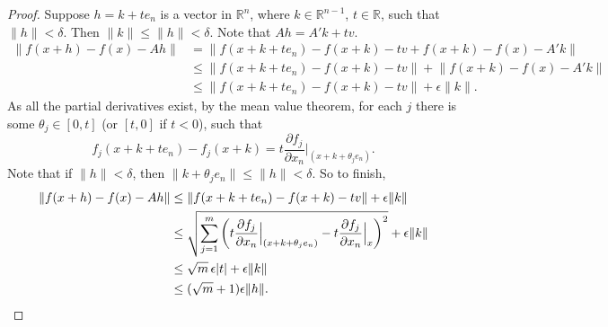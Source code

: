 \documentclass[12pt,openany]{book}
\newcommand{\sabs}[1]{\lvert {#1} \rvert}
\newcommand{\snorm}[1]{\lVert {#1} \rVert}
\newcommand{\R}{{\mathbb{R}}}
\theoremstyle{plain}
\theoremstyle{remark}
\theoremstyle{definition}
\theoremstyle{exercise}
\theoremstyle{example}
\begin{document}
\begin{proof}
Suppose $h = k + t e_n$ is a vector in $\R^n$, where $k \in \R^{n-1}$, $t
\in \R$, such that
$\snorm{h} < \delta$.  Then $\snorm{k} \leq \snorm{h} < \delta$.
Note that $Ah = A' k + tv$.
\begin{equation*}
\begin{split}
\snorm{f(x+h) - f(x) - Ah}
& = \snorm{f(x+k + t e_n) - f(x+k) - tv + f(x+k) - f(x) - A' k}
\\
& \leq \snorm{f(x+k + t e_n) - f(x+k) -tv} + \snorm{f(x+k) - f(x) -
A' k}
\\
& \leq \snorm{f(x+k + t e_n) - f(x+k) -tv} + \epsilon \snorm{k} .
\end{split}
\end{equation*}
As all the partial derivatives exist, by the mean value theorem,
for each $j$ there is some $\theta_j \in [0,t]$ (or $[t,0]$ if $t < 0$), such that
\begin{equation*}
f_j(x+k + t e_n) - f_j(x+k) =
t \frac{\partial f_j}{\partial x_n}\Big|_{(x+k+\theta_j e_n)}.
\end{equation*}
Note that if $\snorm{h} < \delta$, then $\snorm{k+\theta_j e_n} \leq \snorm{h}
< \delta$.
So to finish,
\begin{equation*}
\begin{split}
\snorm{f(x+h) - f(x) - Ah}
& \leq \snorm{f(x+k + t e_n) - f(x+k) -tv} + \epsilon \snorm{k}
\\
& \leq \sqrt{\sum_{j=1}^m
{\left(t\frac{\partial f_j}{\partial x_n}\Big|_{(x+k+\theta_j e_n)} -
t \frac{\partial f_j}{\partial x_n}\Big|_{x}\right)}^2} + \epsilon \snorm{k}
\\
& \leq \sqrt{m}\, \epsilon \sabs{t} + \epsilon \snorm{k}
\\
& \leq (\sqrt{m}+1)\epsilon \snorm{h} . \qedhere
\end{split}
\end{equation*}
\end{proof}
\end{document}
